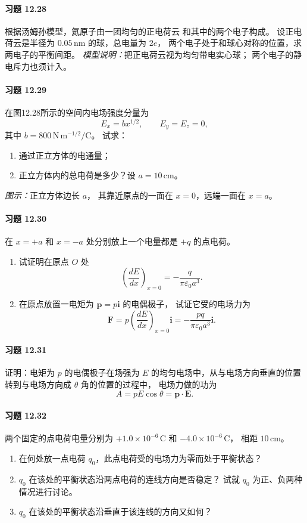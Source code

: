 \paragraph{习题 12.28}
根据汤姆孙模型，氦原子由一团均匀的正电荷云
和其中的两个电子构成。
设正电荷云是半径为
\(0.05\,\mathrm{nm}\) 的球，总电量为 \(2e\)，
两个电子处于和球心对称的位置，求两电子的平衡间距。
\textit{模型说明：}把正电荷云视为均匀带电实心球；
两个电子的静电斥力也须计入。

\paragraph{习题 12.29}
在图12.28所示的空间内电场强度分量为
\[
 E_x=bx^{1/2},\qquad E_y=E_z=0,
\]
其中 \(b=800\,\mathrm{N\,m^{-1/2}/C}\)。
试求：
\begin{enumerate}
\item 通过正立方体的电通量；
\item 正立方体内的总电荷是多少？设 \(a=10\,\mathrm{cm}\)。
\end{enumerate}
\textit{图示：}正立方体边长 \(a\)，
其靠近原点的一面在 \(x=0\)，远端一面在 \(x=a\)。

\paragraph{习题 12.30}
在 \(x=+a\) 和 \(x=-a\) 处分别放上一个电量都是
\(+q\) 的点电荷。
\begin{enumerate}
\item 试证明在原点 \(O\) 处
\[
 \left(\frac{dE}{dx}\right)_{x=0}
 =-\frac{q}{\pi\varepsilon_0a^3}.
\]
\item 在原点放置一电矩为
\(\boldsymbol p=p\boldsymbol i\) 的电偶极子，
试证它受的电场力为
\[
 \boldsymbol F=p\left(\frac{dE}{dx}\right)_{x=0}
 \boldsymbol i
 =-\frac{pq}{\pi\varepsilon_0a^3}\boldsymbol i.
\]
\end{enumerate}

\paragraph{习题 12.31}
证明：电矩为 \(p\) 的电偶极子在场强为 \(E\)
的均匀电场中，从与电场方向垂直的位置
转到与电场方向成 \(\theta\) 角的位置的过程中，
电场力做的功为
\[
 A=pE\cos\theta=\boldsymbol p\cdot\boldsymbol E.
\]

\paragraph{习题 12.32}
两个固定的点电荷电量分别为
\(+1.0\times10^{-6}\,\mathrm C\) 和
\(-4.0\times10^{-6}\,\mathrm C\)，
相距 \(10\,\mathrm{cm}\)。
\begin{enumerate}
\item 在何处放一点电荷 \(q_0\)，此点电荷受的电场力为零而处于平衡状态？
\item \(q_0\) 在该处的平衡状态沿两点电荷的连线方向是否稳定？
  试就 \(q_0\) 为正、负两种情况进行讨论。
\item \(q_0\) 在该处的平衡状态沿垂直于该连线的方向又如何？
\end{enumerate}

